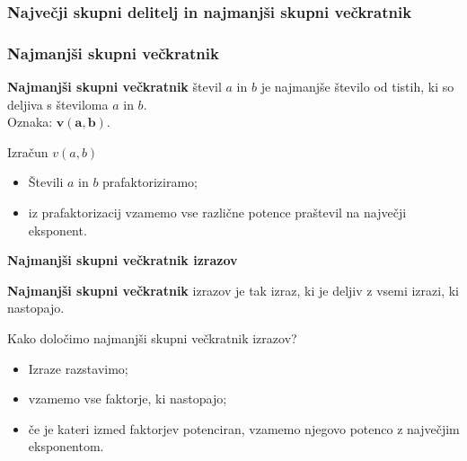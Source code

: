         \begin{frame}
            \frametitle{Največji skupni delitelj in najmanjši skupni večkratnik}
        \end{frame}

        \begin{frame}[t]
            \frametitle{Najmanjši skupni večkratnik}


            \begin{alertblock}{}
                \textbf{Najmanjši skupni večkratnik} števil $a$ in $b$ je najmanjše število od tistih, ki so deljiva s številoma $a$ in $b$. \\ 
                Oznaka: $\mathbf{v(a,b)}$.
            \end{alertblock}

            \pause

            \begin{block}{Izračun $v(a,b)$}
                \begin{itemize}
                    \item Števili $a$ in $b$ prafaktoriziramo;
                    \item iz prafaktorizacij vzamemo vse različne potence praštevil na največji eksponent.
                \end{itemize}
            \end{block}
        \end{frame}

        \begin{frame}[t]
            \Large\textbf{Najmanjši skupni večkratnik izrazov}
            ~\\
            \normalsize

            \pause

            \begin{alertblock}{}
                \textbf{Najmanjši skupni večkratnik} izrazov je tak izraz, ki je deljiv z vsemi izrazi, ki nastopajo. 
            \end{alertblock}

            \pause

            \begin{block}{Kako določimo najmanjši skupni večkratnik izrazov?}
                \begin{itemize}
                    \item<4-> Izraze razstavimo;
                    \item<5-> vzamemo vse faktorje, ki nastopajo;
                    \item<6-> če je kateri izmed faktorjev potenciran, vzamemo njegovo potenco z največjim eksponentom.
                \end{itemize}
            \end{block}
        \end{frame}

